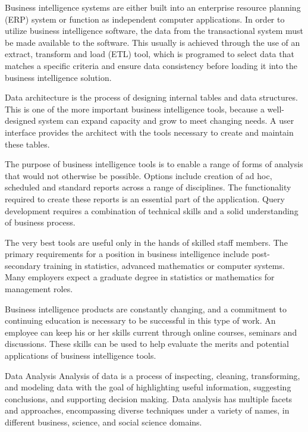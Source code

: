 Business intelligence systems are either built into an enterprise resource planning (ERP) system or function as independent computer applications. In order to utilize business intelligence software, the data from the transactional system must be made available to the software. This usually is achieved through the use of an extract, transform and load (ETL) tool, which is programed to select data that matches a specific criteria and ensure data consistency before loading it into the business intelligence solution.

Data architecture is the process of designing internal tables and data structures. This is one of the more important business intelligence tools, because a well-designed system can expand capacity and grow to meet changing needs. A user interface provides the architect with the tools necessary to create and maintain these tables.

The purpose of business intelligence tools is to enable a range of forms of analysis that would not otherwise be possible. Options include creation of ad hoc, scheduled and standard reports across a range of disciplines. The functionality required to create these reports is an essential part of the application. Query development requires a combination of technical skills and a solid understanding of business process.

The very best tools are useful only in the hands of skilled staff members. The primary requirements for a position in business intelligence include post-secondary training in statistics, advanced mathematics or computer systems. Many employers expect a graduate degree in statistics or mathematics for management roles.

Business intelligence products are constantly changing, and a commitment to continuing education is necessary to be successful in this type of work. An employee can keep his or her skills current through online courses, seminars and discussions. These skills can be used to help evaluate the merits and potential applications of business intelligence tools.






Data Analysis
Analysis of data is a process of inspecting, cleaning, transforming, and modeling data with the goal of highlighting useful information, suggesting conclusions, and supporting decision making. Data analysis has multiple facets and approaches, encompassing diverse techniques under a variety of names, in different business, science, and social science domains.

